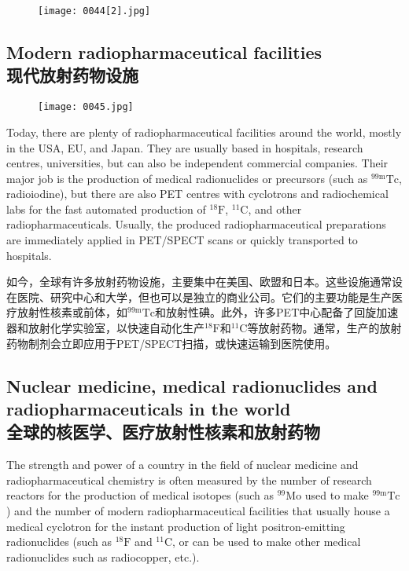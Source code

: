 \documentclass[dvipsnames, svgnames,a4paper,11pt]{article}
\begin{document}
\begin{figure}[ht]
      \centering
      \texttt{[image: 0044[2].jpg]}
       \label{fig38}
\end{figure}

\subsection{Modern radiopharmaceutical facilities\\现代放射药物设施}


\begin{figure}[ht]
      \centering
      \texttt{[image: 0045.jpg]}
 \label{fig39}
\end{figure}

Today, there are plenty of radiopharmaceutical facilities around the world, mostly in the USA, EU, and Japan. They are usually based in hospitals, research centres, universities, but can also be independent commercial companies. Their major job is the production of medical radionuclides or precursors (such as \(\mathrm{^{99m}Tc}\), radioiodine), but there are also PET centres with cyclotrons and radiochemical labs for the fast automated production of \(\mathrm{^{18}F}\), \(\mathrm{^{11}C}\), and other radiopharmaceuticals. Usually, the produced radiopharmaceutical preparations are immediately applied in PET/SPECT scans or quickly transported to hospitals.  

如今，全球有许多放射药物设施，主要集中在美国、欧盟和日本。这些设施通常设在医院、研究中心和大学，但也可以是独立的商业公司。它们的主要功能是生产医疗放射性核素或前体，如${}^\text{99m}\text{Tc}$和放射性碘。此外，许多PET中心配备了回旋加速器和放射化学实验室，以快速自动化生产${}^\text{18}\text{F}$和${}^\text{11}\text{C}$等放射药物。通常，生产的放射药物制剂会立即应用于PET/SPECT扫描，或快速运输到医院使用。

\subsection{Nuclear medicine, medical radionuclides and radiopharmaceuticals in the world\\全球的核医学、医疗放射性核素和放射药物}

The strength and power of a country in the field of nuclear medicine and radiopharmaceutical chemistry is often measured by the number of research reactors for the production of medical isotopes (such as \(\mathrm{^{99}Mo}\) used to make \(\mathrm{^{99m}Tc}\)) and the number of modern radiopharmaceutical facilities that usually house a medical cyclotron for the instant production of light positron-emitting radionuclides (such as \(\mathrm{^{18}F}\) and \(\mathrm{^{11}C}\), or can be used to make other medical radionuclides such as radiocopper, etc.).  
\end{document}
